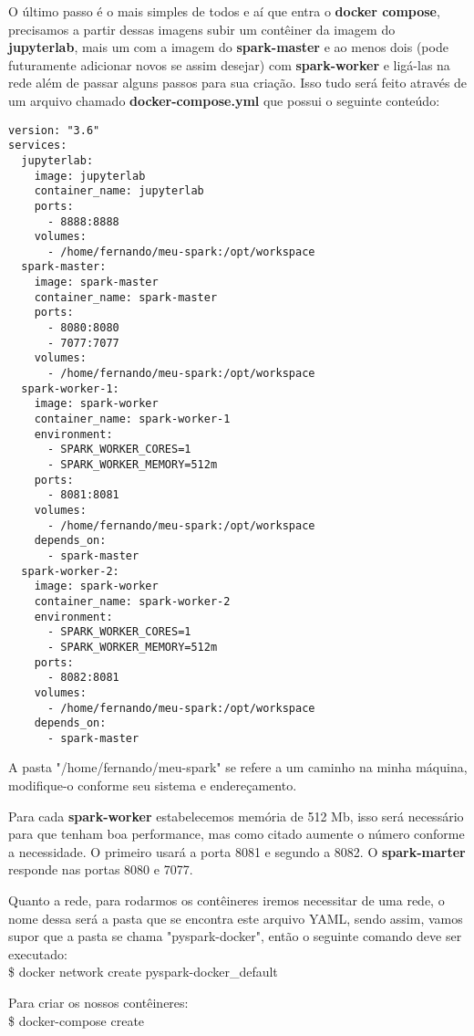 O último passo é o mais simples de todos e aí que entra o \textbf{docker compose}, precisamos a partir dessas imagens subir um contêiner da imagem do \textbf{jupyterlab}, mais um com a imagem do \textbf{spark-master} e ao menos dois (pode futuramente adicionar novos se assim desejar) com \textbf{spark-worker} e ligá-las na rede além de passar alguns passos para sua criação. Isso tudo será feito através de um arquivo chamado \textbf{docker-compose.yml} que possui o seguinte conteúdo:
\begin{lstlisting}[]
version: "3.6"
services:
  jupyterlab:
    image: jupyterlab
    container_name: jupyterlab
    ports:
      - 8888:8888
    volumes:
      - /home/fernando/meu-spark:/opt/workspace
  spark-master:
    image: spark-master
    container_name: spark-master
    ports:
      - 8080:8080
      - 7077:7077
    volumes:
      - /home/fernando/meu-spark:/opt/workspace
  spark-worker-1:
    image: spark-worker
    container_name: spark-worker-1
    environment:
      - SPARK_WORKER_CORES=1
      - SPARK_WORKER_MEMORY=512m
    ports:
      - 8081:8081
    volumes:
      - /home/fernando/meu-spark:/opt/workspace
    depends_on:
      - spark-master
  spark-worker-2:
    image: spark-worker
    container_name: spark-worker-2
    environment:
      - SPARK_WORKER_CORES=1
      - SPARK_WORKER_MEMORY=512m
    ports:
      - 8082:8081
    volumes:
      - /home/fernando/meu-spark:/opt/workspace
    depends_on:
      - spark-master
\end{lstlisting}

A pasta "/home/fernando/meu-spark" se refere a um caminho na minha máquina, modifique-o conforme seu sistema e endereçamento.

Para cada \textbf{spark-worker} estabelecemos memória de 512 Mb, isso será necessário para que tenham boa performance, mas como citado aumente o número conforme a necessidade. O primeiro usará a porta 8081 e segundo a 8082. O \textbf{spark-marter} responde nas portas 8080 e 7077.

Quanto a rede, para rodarmos os contêineres iremos necessitar de uma rede, o nome dessa será a pasta que se encontra este arquivo YAML, sendo assim, vamos supor que a pasta se chama "pyspark-docker", então o seguinte comando deve ser executado: \\
{\ttfamily\$ docker network create pyspark-docker\_default}

Para criar os nossos contêineres: \\
{\ttfamily\$ docker-compose create}

